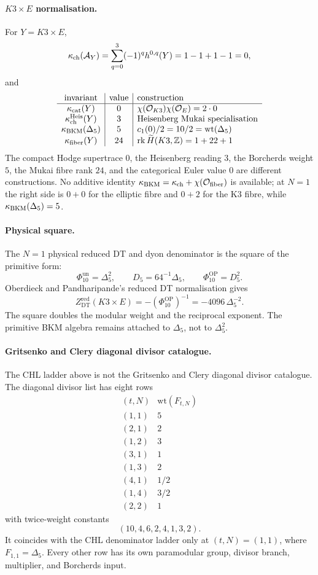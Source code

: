 \paragraph{\(K3\times E\) normalisation.}
For \(Y=K3\times E\),
\[
  \kappa_{\mathrm{ch}}(\mathcal A_Y)=
  \sum_{q=0}^{3}(-1)^q h^{0,q}(Y)
  =1-1+1-1=0,
\]
and
\[
\begin{array}{c|c|l}
\text{invariant} & \text{value} & \text{construction}\\ \hline
\kappa_{\mathrm{cat}}(Y) & 0 & \chi(\mathcal O_{K3})\chi(\mathcal O_E)=2\cdot0\\
\kappa_{\mathrm{ch}}^{\mathrm{Heis}}(Y) & 3 & \text{Heisenberg Mukai specialisation}\\
\kappa_{\mathrm{BKM}}(\Delta_5) & 5 & c_1(0)/2=10/2=\mathrm{wt}(\Delta_5)\\
\kappa_{\mathrm{fiber}}(Y) & 24 & \mathrm{rk}\,\widetilde H(K3,\mathbb{Z})=1+22+1
\end{array}
\]
The compact Hodge supertrace \(0\), the Heisenberg reading \(3\), the
Borcherds weight \(5\), the Mukai fibre rank \(24\), and the categorical
Euler value \(0\) are different constructions. No additive identity
\(\kappa_{\mathrm{BKM}}=\kappa_{\mathrm{ch}}+\chi(\mathcal O_{\mathrm{fiber}})\) is available; at
\(N=1\) the right side is \(0+0\) for the elliptic fibre and \(0+2\)
for the K3 fibre, while \(\kappa_{\mathrm{BKM}}(\Delta_5)=5\).

\paragraph{Physical square.}
The \(N=1\) physical reduced DT and dyon denominator is the square of
the primitive form:
\[
  \Phi_{10}^{\mathrm{un}}=\Delta_5^2,\qquad
  D_5=64^{-1}\Delta_5,\qquad
  \Phi_{10}^{\mathrm{OP}}=D_5^2.
\]
Oberdieck and Pandharipande's reduced DT normalisation gives
\[
  Z^{\mathrm{red}}_{\mathrm{DT}}(K3\times E)
  =
  -(\Phi_{10}^{\mathrm{OP}})^{-1}
  =
  -4096\,\Delta_5^{-2}.
\]
The square doubles the modular weight and the reciprocal exponent. The
primitive BKM algebra remains attached to \(\Delta_5\), not to
\(\Delta_5^2\).

\paragraph{Gritsenko and Clery diagonal divisor catalogue.}
The CHL ladder above is not the Gritsenko and Clery diagonal divisor
catalogue. The diagonal divisor list has eight rows
\[
\begin{array}{c|c}
(t,N) & \mathrm{wt}(F_{t,N})\\ \hline
(1,1) & 5\\
(2,1) & 2\\
(1,2) & 3\\
(3,1) & 1\\
(1,3) & 2\\
(4,1) & 1/2\\
(1,4) & 3/2\\
(2,2) & 1
\end{array}
\]
with twice-weight constants
\[
  (10,4,6,2,4,1,3,2).
\]
It coincides with the CHL denominator ladder only at
\((t,N)=(1,1)\), where \(F_{1,1}=\Delta_5\). Every other row has its
own paramodular group, divisor branch, multiplier, and Borcherds input.

